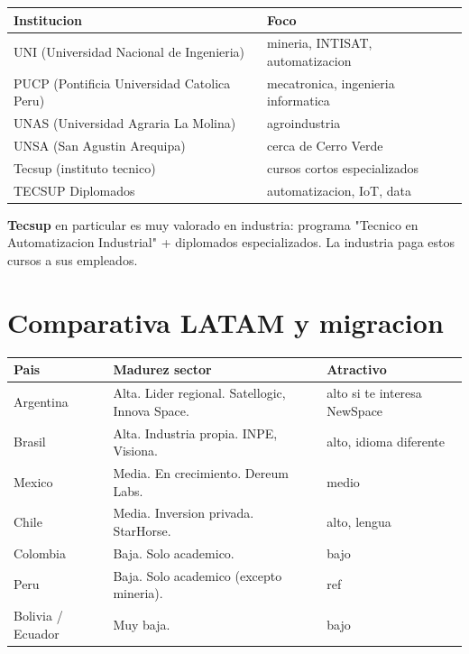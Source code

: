\documentclass[11pt,a4paper,oneside]{report}
\begin{document}
\begin{center}
\begin{tabular}{p{6cm}p{7cm}}
\toprule
\textbf{Institucion} & \textbf{Foco} \\
\midrule
UNI (Universidad Nacional de Ingenieria)        & mineria, INTISAT, automatizacion \\
PUCP (Pontificia Universidad Catolica Peru)     & mecatronica, ingenieria informatica \\
UNAS (Universidad Agraria La Molina)             & agroindustria \\
UNSA (San Agustin Arequipa)                      & cerca de Cerro Verde \\
Tecsup (instituto tecnico)                       & cursos cortos especializados \\
TECSUP Diplomados                                & automatizacion, IoT, data \\
\bottomrule
\end{tabular}
\end{center}

\textbf{Tecsup} en particular es muy valorado en industria: programa
"Tecnico en Automatizacion Industrial" + diplomados especializados.
La industria paga estos cursos a sus empleados.

\chapter{Comparativa LATAM y migracion}

\begin{center}
\begin{tabular}{lll}
\toprule
\textbf{Pais} & \textbf{Madurez sector} & \textbf{Atractivo} \\
\midrule
Argentina & Alta. Lider regional. Satellogic, Innova Space. & alto si te interesa NewSpace \\
Brasil    & Alta. Industria propia. INPE, Visiona.          & alto, idioma diferente \\
Mexico    & Media. En crecimiento. Dereum Labs.              & medio \\
Chile     & Media. Inversion privada. StarHorse.             & alto, lengua \\
Colombia  & Baja. Solo academico.                            & bajo \\
Peru      & Baja. Solo academico (excepto mineria).          & ref \\
Bolivia / Ecuador & Muy baja.                                  & bajo \\
\bottomrule
\end{tabular}
\end{center}
\end{document}
